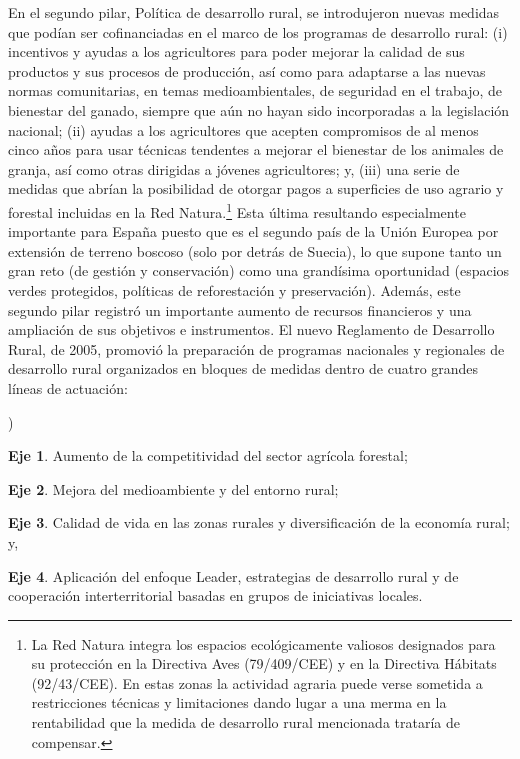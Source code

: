 \documentclass[10pt,a4paper]{article}
\newcounter{alphaitem}
\newenvironment{la}
      {\begin{list}{\alph{alphaitem})}{%
          \usecounter{alphaitem}%
          \setlength{\leftmargin}{1cm}%
          \setlength{\parskip}{3pt}%
          \setlength{\itemsep}{0pt}%
          \setlength{\parsep}{0pt}%
      }}
      {\end{list}}
\begin{document}
En el segundo pilar, Política de desarrollo rural, se introdujeron nuevas medidas que podían ser cofinanciadas en el marco de los programas de desarrollo rural: (i) incentivos y ayudas a los agricultores para poder mejorar la calidad de sus productos y sus procesos de producción, así como para adaptarse a las nuevas normas comunitarias, en temas medioambientales, de seguridad en el trabajo, de bienestar del ganado, siempre que aún no hayan sido incorporadas a la legislación nacional; (ii) ayudas a los agricultores que acepten compromisos de al menos cinco años para usar técnicas tendentes a mejorar el bienestar de los animales de granja, así como otras dirigidas a jóvenes agricultores; y, (iii) una serie de medidas que abrían la posibilidad de otorgar pagos a superficies de uso agrario y forestal incluidas en la Red Natura.\footnote{%
    La Red Natura integra los espacios ecológicamente valiosos designados para su protección en la Directiva Aves (79/409/CEE) y en la Directiva Hábitats (92/43/CEE). En estas zonas la actividad agraria puede verse sometida a restricciones técnicas y limitaciones dando lugar a una merma en la rentabilidad que la medida de desarrollo rural mencionada trataría de compensar.
} Esta última resultando especialmente importante para España puesto que es el segundo país de la Unión Europea por extensión de terreno boscoso (solo por detrás de Suecia), lo que supone tanto un gran reto (de gestión y conservación) como una grandísima oportunidad (espacios verdes protegidos, políticas de reforestación y preservación). Además, este segundo pilar registró un importante aumento de recursos financieros y una ampliación de sus objetivos e instrumentos. El nuevo Reglamento de Desarrollo Rural, de 2005, promovió la preparación de programas nacionales y regionales de desarrollo rural organizados en bloques de medidas dentro de cuatro grandes líneas de actuación:
\begin{la}
  \item \textbf{Eje 1}. Aumento de la competitividad del sector agrícola forestal;
  \item \textbf{Eje 2}. Mejora del medioambiente y del entorno rural;
  \item \textbf{Eje 3}. Calidad de vida en las zonas rurales y diversificación de la economía rural; y, 
  \item \textbf{Eje 4}. Aplicación del enfoque Leader, estrategias de desarrollo rural y de cooperación interterritorial basadas en grupos de iniciativas locales.
\end{la}
\end{document}
